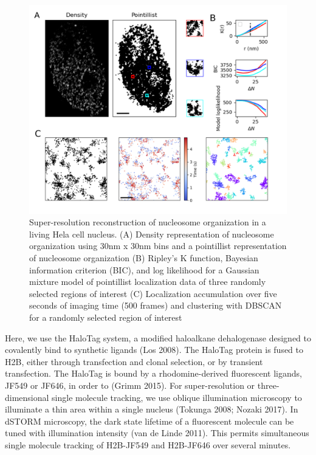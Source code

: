 \documentclass{ucetd}
\begin{document}
\begin{figure}
\begin{center}
\includegraphics[width=16cm]{ClusterFull.png}
\end{center}
\caption{Super-resolution reconstruction of nucleosome organization in a living Hela cell nucleus. (A) Density representation of nucleosome organization using 30nm x 30nm bins and a pointillist representation of nucleosome organization (B) Ripley's K function, Bayesian information criterion (BIC), and log likelihood for a Gaussian mixture model of pointillist localization data of three randomly selected regions of interest (C) Localization accumulation over five seconds of imaging time (500 frames) and clustering with DBSCAN for a randomly selected region of interest}
\end{figure}

Here, we use the HaloTag system, a modified haloalkane dehalogenase designed to covalently bind to synthetic ligands  (Los 2008). The HaloTag protein is fused to H2B, either through transfection and clonal selection, or by transient transfection. The HaloTag is bound by a rhodomine-derived fluorescent ligands, JF549 or JF646, in order to (Grimm 2015). For super-resolution or three-dimensional single molecule tracking, we use oblique illumination microscopy to illuminate a thin area within a single nucleus (Tokunga 2008; Nozaki 2017). In dSTORM microscopy, the dark state lifetime of a fluorescent molecule can be tuned with illumination intensity (van de Linde 2011). This permits simultaneous single molecule tracking of H2B-JF549 and H2B-JF646 over several minutes. 
\end{document}
